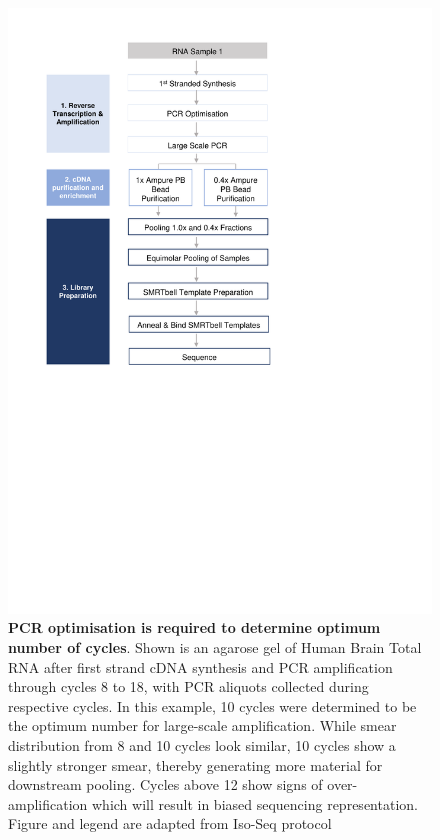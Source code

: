 \begin{figure}[htp]
	\begin{center}
		\includegraphics[page=13,trim={1cm 24cm 10cm 1cm},clip,scale = 0.9]{Figures/ProjectDevelopment_Figures.pdf}
	\end{center}
	\captionsetup{width=0.95\textwidth}
	\caption[Example of an Agarose gel for determining optimum number of PCR cycles for amplification]%
	{\textbf{PCR optimisation is required to determine optimum number of cycles}. Shown is an agarose gel of Human Brain Total RNA after first strand cDNA synthesis and PCR amplification through cycles 8 to 18, with PCR aliquots collected during respective cycles. In this example, 10 cycles were determined to be the optimum number for large-scale amplification. While smear distribution from 8 and 10 cycles look similar, 10 cycles show a slightly stronger smear, thereby generating more material for downstream pooling. Cycles above 12 show signs of over-amplification which will result in biased sequencing representation. Figure and legend are adapted from Iso-Seq protocol}
	\label{fig:pcr_optimisation_gel_eg}
\end{figure}


